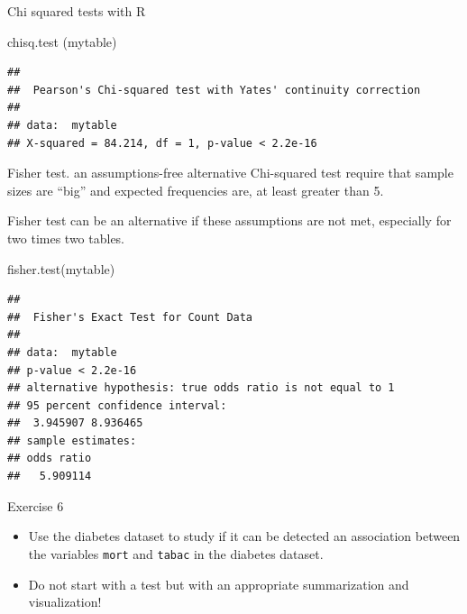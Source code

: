 \documentclass[
  ignorenonframetext,
]{beamer}
\newenvironment{Shaded}{\begin{snugshade}}{\end{snugshade}}
\newcommand{\FunctionTok}[1]{\textcolor[rgb]{0.00,0.00,0.00}{#1}}
\newcommand{\NormalTok}[1]{#1}
\begin{document}
\begin{frame}[fragile]{Chi squared tests with R}
\protect\hypertarget{chi-squared-tests-with-r}{}
\begin{Shaded}
\begin{Highlighting}[]
\FunctionTok{chisq.test}\NormalTok{ (mytable)}
\end{Highlighting}
\end{Shaded}

\begin{verbatim}
## 
##  Pearson's Chi-squared test with Yates' continuity correction
## 
## data:  mytable
## X-squared = 84.214, df = 1, p-value < 2.2e-16
\end{verbatim}
\end{frame}

\begin{frame}[fragile]{Fisher test. an assumptions-free alternative}
\protect\hypertarget{fisher-test.-an-assumptions-free-alternative}{}
Chi-squared test require that sample sizes are ``big'' and expected
frequencies are, at least greater than 5.

Fisher test can be an alternative if these assumptions are not met,
especially for two times two tables.

\begin{Shaded}
\begin{Highlighting}[]
\FunctionTok{fisher.test}\NormalTok{(mytable)}
\end{Highlighting}
\end{Shaded}

\begin{verbatim}
## 
##  Fisher's Exact Test for Count Data
## 
## data:  mytable
## p-value < 2.2e-16
## alternative hypothesis: true odds ratio is not equal to 1
## 95 percent confidence interval:
##  3.945907 8.936465
## sample estimates:
## odds ratio 
##   5.909114
\end{verbatim}
\end{frame}

\begin{frame}[fragile]{Exercise 6}
\protect\hypertarget{exercise-6}{}
\begin{itemize}
\item
  Use the diabetes dataset to study if it can be detected an association
  between the variables \texttt{mort} and \texttt{tabac} in the diabetes
  dataset.
\item
  Do not start with a test but with an appropriate summarization and
  visualization!
\end{itemize}
\end{frame}
\end{document}
